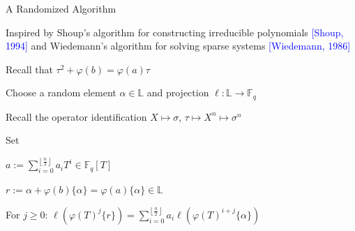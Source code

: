 \documentclass{beamer}
\newcommand{\f}{\mathbb{F}}
\newcommand{\blue}{\textcolor{blue}}
\newcommand{\spa}{\vspace{0.2cm}}
\newcommand{\spa}{\textnormal{ }}
\begin{document}

\begin{frame}{A Randomized Algorithm}


     Inspired by Shoup's algorithm for constructing irreducible polynomials \blue{[Shoup, 1994]} and Wiedemann's algorithm for solving sparse systems \blue{[Wiedemann, 1986]}
     
     \spa
     
    \item Recall that $\tau^2 + \varphi(b) = \varphi(a) \tau$
    
    
    \item Choose a random element $\alpha \in \mathbb{L}$ and projection $\ell : \mathbb{L} \to \f_q$
    \item Recall the operator identification $X \mapsto \sigma$, $\tau \mapsto X^n \mapsto \sigma^n$
    \item Set
       \item \centerline{$a := \sum_{i=0}^{\left\lfloor \frac{n}{2} \right\rfloor}a_iT^i \in \mathbb{F}_q[T]$}
    \item \centerline{$r := \alpha + \varphi(b)\{\alpha\} = \varphi(a)\{\alpha\} \in \mathbb{L}$}
 
    
    \item For $j \geq 0$: $\ell(\varphi(T)^j\{ r \}) = \sum_{i = 0}^{\left\lfloor{\frac{n}{2}} \right\rfloor}a_i\ell(\varphi(T)^{i+j}\{\alpha\})$
 
    
    \end{frame}
    
\end{document}

